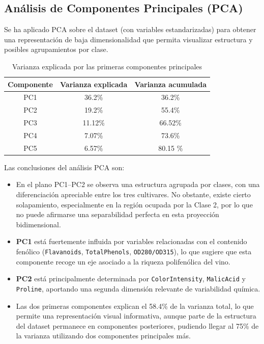 \subsection{An\'alisis de Componentes Principales (PCA)}

Se ha aplicado PCA sobre el dataset (con variables estandarizadas) para obtener una
representaci\'on de baja dimensionalidad que permita visualizar estructura y posibles agrupamientos por clase.

\begin{table}[h]
    \centering
    \caption{Varianza explicada por las primeras componentes principales}
    \begin{tabular}{ccc}
        \toprule
        \textbf{Componente} & \textbf{Varianza explicada} & \textbf{Varianza acumulada} \\
        \midrule
        PC1 & 36.2\% & 36.2\% \\
        PC2 & 19.2\% & 55.4\% \\
        PC3 & 11.12\% &   66.52\% \\
        PC4 &  7.07\% & 73.6\% \\
        PC5 &  6.57\% & 80.15 \% \\
        \bottomrule
    \end{tabular}
    \label{tab:pca}
\end{table}

Las conclusiones del análisis PCA son:

\begin{itemize}

    \item En el plano PC1--PC2 se observa una estructura agrupada por clases,
    con una diferenciación apreciable entre los tres cultivares. No obstante,
    existe cierto solapamiento, especialmente en la región ocupada por la
    Clase 2, por lo que no puede afirmarse una separabilidad perfecta en esta
    proyección bidimensional.

    \item \textbf{PC1} está fuertemente influida por variables relacionadas con
    el contenido fenólico (\texttt{Flavanoids}, \texttt{TotalPhenols},
    \texttt{OD280/OD315}), lo que sugiere que esta componente recoge un eje
    asociado a la riqueza polifenólica del vino.

    \item \textbf{PC2} está principalmente determinada por
    \texttt{ColorIntensity}, \texttt{MalicAcid} y \texttt{Proline}, aportando
    una segunda dimensión relevante de variabilidad química.

    \item Las dos primeras componentes explican el 58.4\% de la varianza total,
    lo que permite una representación visual informativa, aunque parte de la
    estructura del dataset permanece en componentes posteriores, pudiendo llegar al 75\% de la varianza utilizando dos componentes principales más.

\end{itemize}



